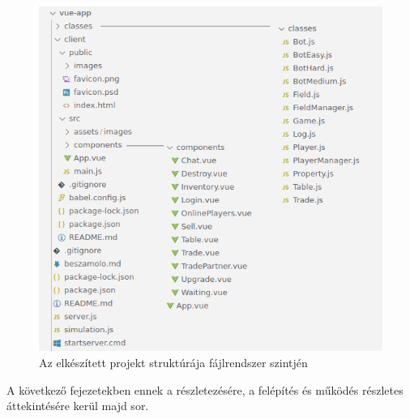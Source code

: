 \begin{figure}[h!]
	\centering
	\includegraphics[scale=3]{images/project_structure.png}
	\caption{Az elkészített projekt struktúrája fájlrendszer szintjén}
	\label{fig:project_structure}
\end{figure}

A következő fejezetekben ennek a részletezésére, a felépítés és működés részletes áttekintésére kerül majd sor.
